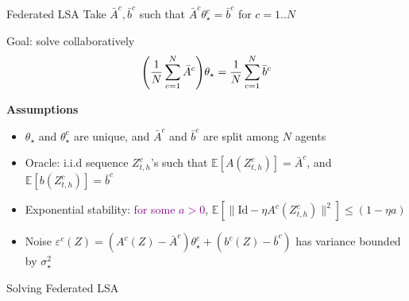 \documentclass[aspectratio=169,14pt]{beamer}
\begin{document}
\begin{frame}{Federated LSA}
  Take $\bar{A}^c, \bar{b}^c$ such that $\bar{A}^c \theta_\star^c = \bar{b}^c$ for $c = 1 .. N$

  \pause
  
  Goal: solve collaboratively
  \begin{equation}
    \small
    \nonumber
    \Bigg( \frac{1}{N} \sum_{c=1}^{N} \bar{A}^c \Bigg) \theta_\star
    = 
    \frac{1}{N} \sum_{c=1}^{N} \bar{b}^c
  \end{equation}
  \vspace{-1em}

  \pause

  \vspace{-1em}
  
  \textbf{Assumptions}

  \vspace{-0.5em}
  
  \begin{itemize}\setlength{\itemindent}{-1em}
    \small
  \item $\theta_\star$ and $\theta_\star^c$ are unique, and $\bar{A}^c$ and $\bar{b}^c$ are split among $N$ agents
    
    \vspace{0.2em}

  \item Oracle: i.i.d sequence $Z_{t,h}^c$'s such that
    $\mathbb{E} [A(Z_{t,h}^c)] = \bar{A}^c$, and
    $\mathbb{E} [b(Z_{t,h}^c)] = \bar{b}^c$
    
      \vspace{0.2em}

    \item Exponential stability: \textcolor{purple}{for some $a > 0$}, $\mathbb{E}[ \| \text{Id} - \eta A^c(Z_{t,h}^c) \|^2 ] \le (1 - \eta a)$ 

    \vspace{0.2em}

  \item Noise $\varepsilon^c(Z) = (A^c(Z) - \bar{A}^c) \theta_\star^c + (b^c(Z) - \bar{b}^c)$ has variance bounded by $\sigma_\star^2$
  \end{itemize}

\end{frame}


\begin{frame}
  \vspace{6em}

  \begin{center}
    \textcolor{beamer@blendedblue}{
      \huge Solving Federated LSA
    }
  \end{center}

  \vspace{3em}
  

  \small
\end{frame}
\end{document}
